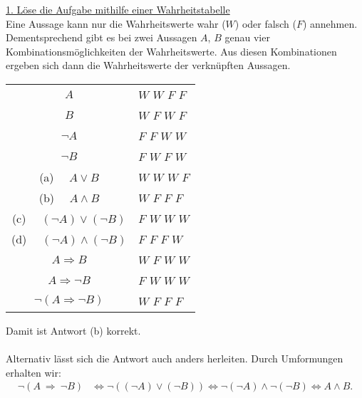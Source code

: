 \underline{1. Löse die Aufgabe mithilfe einer Wahrheitstabelle}\\
Eine Aussage kann nur die Wahrheitswerte wahr ($ W $) oder falsch ($ F $) annehmen.
Dementsprechend gibt es bei zwei Aussagen $ A $, $ B $ genau vier Kombinationsmöglichkeiten der Wahrheitswerte.
Aus diesen Kombinationen ergeben sich dann die Wahrheitswerte der verknüpften Aussagen.
\begin{center}
	\begin{tabular}{cllll}
		\hline
		\multicolumn{1}{c|}{$A$} & \multicolumn{4}{l}{$W$ $W$ $F$ $F$} \\
		\multicolumn{1}{c|}{$B$} & \multicolumn{4}{l}{$W$ $F$ $W$ $F$} \\ 
		\multicolumn{1}{c|}{$\neg A$} & \multicolumn{4}{l}{$F$ $F$ $W$ $W$} \\
		\multicolumn{1}{c|}{$\neg B$} & \multicolumn{4}{l}{$F$ $W$ $F$ $W$} \\
		\hline
		\multicolumn{1}{c|}{(a) \ \ $ A \vee B$} & \multicolumn{4}{l}{$W$ $W$ $W$ $F$} \\ 
		\multicolumn{1}{c|}{(b) \ \ $ A \wedge B$} & \multicolumn{4}{l}{$W$ $F$ $F$ $F$} \\ 
		\multicolumn{1}{c|}{(c) \ \ $ (\neg A) \vee (\neg B)$} & \multicolumn{4}{l}{$F$ $W$ $W$ $W$} \\
		\multicolumn{1}{c|}{(d) \ \ $ (\neg A) \wedge (\neg B)$} & \multicolumn{4}{l}{$F$ $F$ $F$ $W$} \\
		\hline
		\multicolumn{1}{c|}{$ A \Rightarrow B$} & \multicolumn{4}{l}{$W$ $F$ $W$ $W$} \\ 
		\multicolumn{1}{c|}{$ A \Rightarrow  \neg B$} & \multicolumn{4}{l}{$F$ $W$ $W$ $W$} \\ 
		\multicolumn{1}{c|}{$ \neg(A \Rightarrow  \neg B)$} & \multicolumn{4}{l}{$W$ $F$ $F$ $F$} \\ 
		\hline
	\end{tabular}
\end{center}
Damit ist Antwort (b) korrekt. \\
\\
Alternativ lässt sich die Antwort auch anders herleiten. Durch Umformungen erhalten wir:
\begin{align*}
	\neg (A \ \Rightarrow \ \neg B)
	&\Leftrightarrow
	\neg ((\neg A) \vee (\neg B))
	\Leftrightarrow
	\neg (\neg A) \wedge \neg(\neg B)
	\Leftrightarrow
	A \wedge B.
\end{align*}


\newpage

